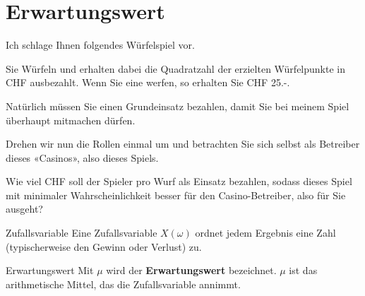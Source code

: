 \section{Erwartungswert}

Ich schlage Ihnen folgendes Würfelspiel vor.

Sie Würfeln und erhalten dabei die Quadratzahl der erzielten
Würfelpunkte in CHF ausbezahlt. Wenn Sie \zB eine  werfen,
so erhalten Sie CHF 25.-.

Natürlich müssen Sie einen Grundeinsatz bezahlen, damit Sie bei meinem
Spiel überhaupt mitmachen dürfen.

Drehen wir nun die Rollen einmal um und betrachten Sie sich selbst als
Betreiber dieses «Casinos», also dieses Spiels.

Wie viel CHF soll der Spieler pro Wurf als Einsatz bezahlen, sodass
dieses Spiel mit minimaler Wahrscheinlichkeit besser für den
Casino-Betreiber, also für Sie ausgeht?



\begin{definition}{Zufallsvariable}{}
	Eine Zufallsvariable $X(\omega)$ ordnet jedem Ergebnis eine Zahl
	(typischerweise den Gewinn oder Verlust) zu.
\end{definition}


\begin{definition}{Erwartungswert}{}
	Mit $\mu$ wird der \textbf{Erwartungswert} bezeichnet.
	$\mu$ ist das arithmetische Mittel, das die Zufallsvariable
	annimmt.
\end{definition}
\newpage
